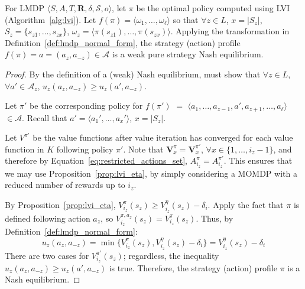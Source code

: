 \begin{proposition}
    \label{prop:lvi_nash}
    For LMDP $\langle S, A, T, \mathbf{R}, \delta, \mathcal{S}, o \rangle$, let $\pi$ be the optimal policy computed using LVI (Algorithm~\ref{alg:lvi}). Let $f(\pi) = \langle \omega_1, \ldots, \omega_\ell \rangle$ so that $\forall z \in L$, $x = |S_z|$, $S_z = \{ s_{z1}, \ldots, s_{zx} \}$, $\omega_z = \langle \pi(s_{z1}), \ldots, \pi(s_{zx}) \rangle$. Applying the transformation in Definition~\ref{def:lmdp_normal_form}, the strategy (action) profile $f(\pi) = a = (a_z, a_{-z}) \in \mathcal{A}$ is a weak pure strategy Nash equilibrium.
\end{proposition}

\begin{proof}
By the definition of a (weak) Nash equilibrium, must show that $\forall z \in L$, $\forall a' \in \mathcal{A}_z$, $u_z(a_z, a_{-z}) \geq u_z(a', a_{-z})$.

Let $\pi'$ be the corresponding policy for $f(\pi')$ $=$ $\langle a_1, \ldots, a_{z-1}, a', a_{z+1}, \ldots, a_\ell \rangle$ $\in \mathcal{A}$. Recall that $a' = \langle a_1', \ldots, a_x' \rangle$, $x = |S_z|$.

Let $V^{\pi'}$ be the value functions after value iteration has converged for each value function in $K$ following policy $\pi'$. Note that $\mathbf{V}_x^\pi = \mathbf{V}_x^{\pi'}$, $\forall x \in \{1, \ldots, i_z - 1\}$, and therefore by Equation~\ref{eq:restricted_actions_set}, $A_{i_z}^\pi = A_{i_z}^{\pi'}$. This ensures that we may use Proposition~\ref{prop:lvi_eta}, by simply considering a MOMDP with a reduced number of rewards up to $i_z$.

By Proposition~\ref{prop:lvi_eta}, $V_{i_z}^\pi (s_z) \geq V_{i_z}^\eta (s_z) - \delta_i$. Apply the fact that $\pi$ is defined following action $a_z$, so $V_{i_z}^{\pi, a_z} (s_z) = V_{i_z}^\pi (s_z)$. Thus, by Definition~\ref{def:lmdp_normal_form}:
\begin{equation*}
    u_z(a_z, a_{-z}) = \min \{ V_{i_z}^\pi (s_z), V_{i_z}^\eta (s_z) - \delta_i \} = V_{i_z}^\eta (s_z) - \delta_i
\end{equation*}
There are two cases for $V_{i_z}^{\pi'} (s_z)$; regardless, the inequality $u_z(a_z, a_{-z}) \geq u_z(a', a_{-z})$ is true. Therefore, the strategy (action) profile $\pi$ is a Nash equilibrium.

%


\end{proof}
